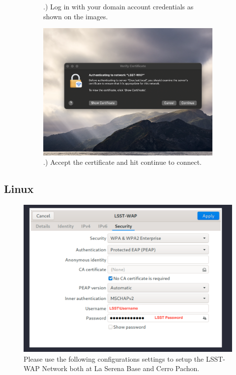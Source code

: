 \begin{figure}
\begin{subfigure}{0.40\textwidth}
      .) Log in with your domain account credentials as shown on the images.
    \end{subfigure}
      \hfill
      \vspace{7mm}
    \begin{subfigure}{0.50\textwidth}
      \includegraphics[width=\textwidth]{Images/Mac4.png}
      .) Accept the certificate and hit continue to connect.
    \end{subfigure}
  \end{figure}

\newpage

  \subsection{Linux}
  \vspace{20mm}
  \begin{figure}
    \centering
    \includegraphics[width=150mm]{Images/Linux2.png}
    \centering
    Please use the following configurations settings to setup the LSST-WAP Network both at La Serena Base and Cerro Pachon. 
  \end{figure}

